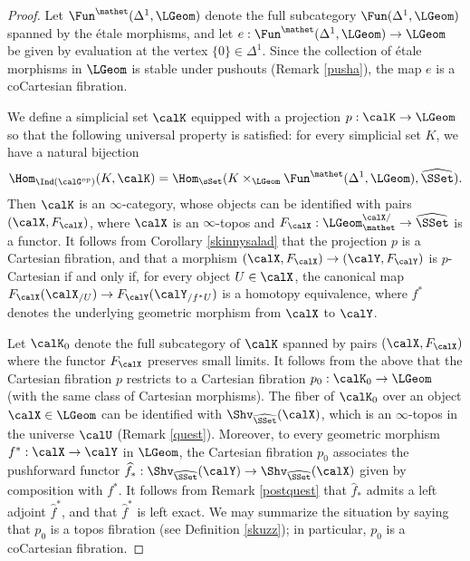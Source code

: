 \begin{proof}
Let $\Fun^{\mathet}( \Delta^1, \LGeom)$ denote the full subcategory $\Fun( \Delta^1, \LGeom)$ spanned by the \'{e}tale morphisms, and let
$e: \Fun^{\mathet}( \Delta^1, \LGeom) \rightarrow \LGeom$ be given by evaluation at the vertex
$\{0\} \in \Delta^1$. Since the collection of \'{e}tale morphisms in $\LGeom$ is stable under pushouts (Remark \ref{pusha}), the map $e$ is a coCartesian fibration.

We define a simplicial set $\calK$ equipped with a projection
$p: \calK \rightarrow \LGeom$ so that the following universal property is satisfied: for every
simplicial set $K$, we have a natural bijection
$$ \Hom_{\Ind(\calG^{op})}(K, \calK) = \Hom_{\sSet}(
K \times_{ \LGeom } \Fun^{\mathet}(\Delta^1, \LGeom), \widehat{\SSet} ).$$
Then $\calK$ is an $\infty$-category, whose objects can be identified with pairs
$(\calX, F_{\calX})$, where $\calX$ is an $\infty$-topos
and $F_{\calX}: \LGeom^{\calX/}_{\mathet} \rightarrow \widehat{\SSet}$ is a functor.
It follows from Corollary \ref{skinnysalad} that the projection $p$ is a Cartesian fibration, and that
a morphism $(\calX,F_{\calX}) \rightarrow (\calY, F_{\calY})$ is $p$-Cartesian if and only if, for every object $U \in \calX$, the canonical map
$F_{\calX}( \calX_{/U}) \rightarrow F_{\calY}( \calY_{/f^{\ast} U})$ is a homotopy equivalence, where $f^{\ast}$ denotes the underlying geometric morphism from $\calX$ to $\calY$.

Let $\calK_0$ denote the full subcategory of $\calK$ spanned by pairs $(\calX, F_{\calX})$ where
the functor $F_{\calX}$ preserves small limits. It follows from the above that the Cartesian
fibration $p$ restricts to a Cartesian fibration $p_0: \calK_0 \rightarrow \LGeom$ (with the same class of Cartesian morphisms). The fiber of $\calK_0$ over an object $\calX \in \LGeom$ can be identified with
$\Shv_{\widehat{\SSet}}( \calX)$, which is an $\infty$-topos in the universe $\calU$ (Remark \ref{quest}). Moreover, to every geometric morphism $f^{\ast}: \calX \rightarrow \calY$ in
$\LGeom$, the Cartesian fibration $p_0$ associates the pushforward functor $\widehat{f}_{\ast}: \Shv_{ \widehat{\SSet} }(\calY) \rightarrow \Shv_{ \widehat{\SSet} }(\calX)$ given by composition with $f^{\ast}$. It follows from Remark \ref{postquest} that $\widehat{f}_{\ast}$ admits a left adjoint
$\widehat{f}^{\ast}$, and that $\widehat{f}^{\ast}$ is left exact. We may summarize the situation
by saying that $p_0$ is a topos fibration (see Definition \ref{skuzz}); in particular, $p_0$ is a coCartesian fibration.


\end{proof}
